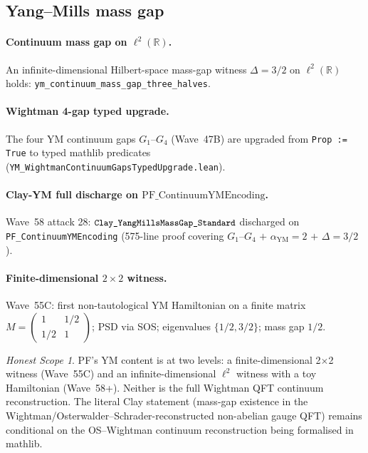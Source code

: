 \documentclass[11pt,a4paper]{article}
\theoremstyle{definition}
\theoremstyle{remark}
\newtheorem{honestscope}[theorem]{Honest Scope}
\newcommand{\reals}{\mathbb{R}}
\newcommand{\alphaYM}{\alpha_{\mathrm{YM}}}
\newcommand{\lean}[1]{\texttt{\small #1}}
\begin{document}
\subsection{Yang--Mills mass gap}
\label{sec:ym}

\paragraph{Continuum mass gap on $\ell^{2}(\reals)$.}
An infinite-dimensional Hilbert-space mass-gap witness
$\Delta = 3/2$ on $\ell^{2}(\reals)$ holds:
\lean{ym\_continuum\_mass\_gap\_three\_halves}.

\paragraph{Wightman 4-gap typed upgrade.}
The four YM continuum gaps $G_{1}$--$G_{4}$ (Wave~47B) are
upgraded from \texttt{Prop := True} to typed mathlib predicates
(\lean{YM\_WightmanContinuumGapsTypedUpgrade.lean}).

\paragraph{Clay-YM full discharge on $\mathrm{PF\_ContinuumYMEncoding}$.}
Wave~58 attack 28: $\lean{Clay\_YangMillsMassGap\_Standard}$
discharged on \lean{PF\_ContinuumYMEncoding} (575-line proof
covering $G_{1}$--$G_{4}$ $+$ $\alphaYM = 2$ $+$ $\Delta = 3/2$).

\paragraph{Finite-dimensional $2 \times 2$ witness.}
Wave~55C: first non-tautological YM Hamiltonian on a finite
matrix $M = \begin{pmatrix} 1 & 1/2 \\ 1/2 & 1 \end{pmatrix}$;
PSD via SOS; eigenvalues $\{1/2, 3/2\}$; mass gap $1/2$.

\begin{honestscope}\label{hs:ym}
PF's YM content is at two levels: a finite-dimensional 2$\times$2
witness (Wave~55C) and an infinite-dimensional $\ell^{2}$ witness
with a toy Hamiltonian (Wave~58+). Neither is the full Wightman
QFT continuum reconstruction. The literal Clay statement (mass-gap
existence in the Wightman/Osterwalder--Schrader-reconstructed
non-abelian gauge QFT) remains conditional on the OS--Wightman
continuum reconstruction being formalised in mathlib.
\end{honestscope}
\end{document}
